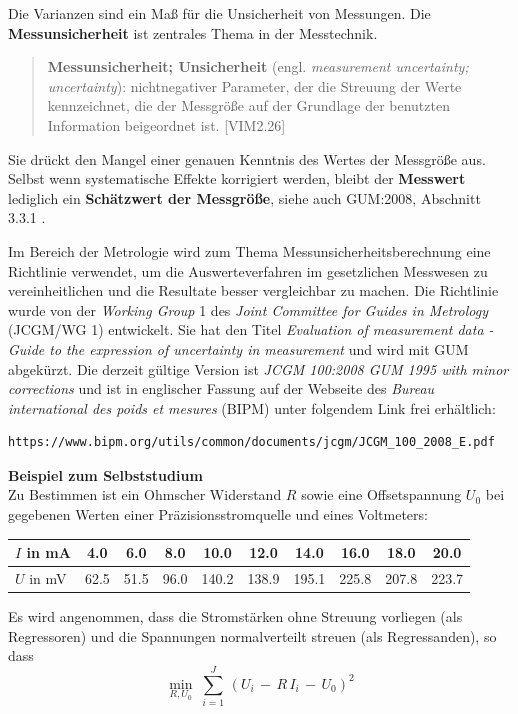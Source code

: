 \documentclass[a4paper,12pt,DIV=15]{scrartcl}
\begin{document}
Die Varianzen sind ein Maß für die Unsicherheit von Messungen. Die \textbf{Messunsicherheit} ist zentrales Thema in der Messtechnik.
\begin{quote}
\textbf{Messunsicherheit; Unsicherheit} (engl. \textsl{measurement uncertainty; uncertainty}): 
nichtnegativer Parameter, der die Streuung der Werte kennzeichnet, die der Messgröße
auf der Grundlage der benutzten Information beigeordnet ist. [VIM2.26]
\end{quote}
Sie drückt den Mangel einer genauen Kenntnis des Wertes der Messgröße aus.
Selbst wenn systematische Effekte korrigiert werden, bleibt der \textbf{Messwert} lediglich
ein \textbf{Schätz\-wert der Messgröße}, siehe auch GUM:2008, Abschnitt 3.3.1 .

Im Bereich der Metrologie wird zum Thema Messunsicherheitsberechnung eine Richtlinie verwendet,
um die Auswerteverfahren im gesetzlichen Messwesen zu vereinheitlichen und die Resultate
besser vergleichbar zu machen. Die Richtlinie wurde von der
\textsl{Working Group} 1 des \textsl{Joint Committee for Guides in Metrology} (JCGM/WG 1)
entwickelt. Sie hat den Titel \textsl{Evaluation of measurement
data - Guide to the expression of uncertainty in measurement} und wird mit GUM abgekürzt.
Die derzeit gültige Version ist
\textsl{JCGM 100:2008 GUM 1995 with minor corrections} und ist in englischer Fassung
auf der Webseite des \textsl{Bureau international des poids et mesures} (BIPM)
unter folgendem Link frei erhältlich:
\begin{verbatim}
https://www.bipm.org/utils/common/documents/jcgm/JCGM_100_2008_E.pdf
\end{verbatim}


\textbf{Beispiel zum Selbststudium}\\
Zu Bestimmen ist ein Ohmscher Widerstand $R$ sowie eine Offsetspannung $U_0$ bei gegebenen Werten einer
Präzisionsstromquelle und eines Voltmeters:

\begin{center}
\begin{tabular}{l||c|c|c|c|c|c|c|c|c}
\hline\hline
 $I$ in mA &    4.0 &     6.0 &     8.0 &    10.0 &    12.0 &    14.0 &    16.0 &    18.0 &    20.0\\
\hline
 $U$ in mV &    62.5 &    51.5 &    96.0 &   140.2 &   138.9 &   195.1 &   225.8 &   207.8 &   223.7 \\
\hline\hline
\end{tabular}
\end{center}

Es wird angenommen, dass die Stromstärken ohne Streuung vorliegen (als Regressoren) und die Spannungen normalverteilt
streuen (als Regressanden), so dass
\begin{equation}
\min_{R, U_0} \; \sum_{i = 1}^J \, \left(U_i \, - \, R \, I_i  \, - \,  U_0\right)^2
\label{regrGer}
\end{equation}
\end{document}

